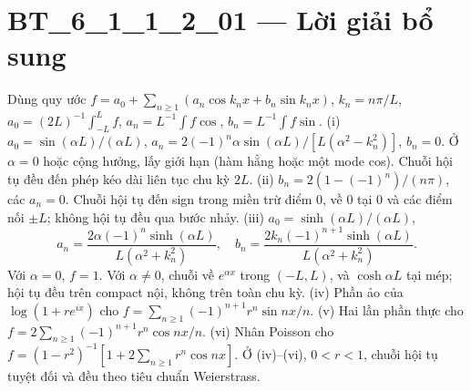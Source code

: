 \documentclass[10pt,a4paper]{article}
\begin{document}
\section*{BT\_6\_1\_1\_2\_01 — Lời giải bổ sung}
Dùng quy ước $f=a_0+\sum_{n\ge1}(a_n\cos k_nx+b_n\sin k_nx)$, $k_n=n\pi/L$, $a_0=(2L)^{-1}\int_{-L}^Lf$, $a_n=L^{-1}\int f\cos$, $b_n=L^{-1}\int f\sin$.
(i) $a_0=\sin(\alpha L)/(\alpha L)$, $a_n=2(-1)^n\alpha\sin(\alpha L)/[L(\alpha^2-k_n^2)]$, $b_n=0$. Ở $\alpha=0$ hoặc cộng hưởng, lấy giới hạn (hàm hằng hoặc một mode cos). Chuỗi hội tụ đều đến phép kéo dài liên tục chu kỳ $2L$.
(ii) $b_n=2(1-(-1)^n)/(n\pi)$, các $a_n=0$. Chuỗi hội tụ đến sign trong miền trừ điểm 0, về 0 tại 0 và các điểm nối $\pm L$; không hội tụ đều qua bước nhảy.
(iii) $a_0=\sinh(\alpha L)/(\alpha L)$,
\[a_n=\frac{2\alpha(-1)^n\sinh(\alpha L)}{L(\alpha^2+k_n^2)},\quad b_n=\frac{2k_n(-1)^{n+1}\sinh(\alpha L)}{L(\alpha^2+k_n^2)}.\]
Với $\alpha=0$, $f=1$. Với $\alpha\ne0$, chuỗi về $e^{\alpha x}$ trong $(-L,L)$, và $\cosh\alpha L$ tại mép; hội tụ đều trên compact nội, không trên toàn chu kỳ.
(iv) Phần ảo của $\log(1+re^{ix})$ cho $f=\sum_{n\ge1}(-1)^{n+1}r^n\sin nx/n$.
(v) Hai lần phần thực cho $f=2\sum_{n\ge1}(-1)^{n+1}r^n\cos nx/n$.
(vi) Nhân Poisson cho $f=(1-r^2)^{-1}[1+2\sum_{n\ge1}r^n\cos nx]$. Ở (iv)--(vi), $0<r<1$, chuỗi hội tụ tuyệt đối và đều theo tiêu chuẩn Weierstrass.
\end{document}
